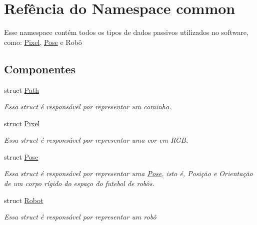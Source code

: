 \hypertarget{namespacecommon}{}\section{Refência do Namespace common}
\label{namespacecommon}


Esse namespace contém todos os tipos de dados passivos utilizados no software, como\+: \hyperlink{structcommon_1_1Pixel}{Pixel}, \hyperlink{structcommon_1_1Pose}{Pose} e Robô  


\subsection*{Componentes}
\begin{DoxyCompactItemize}
\item 
struct \hyperlink{structcommon_1_1Path}{Path}
\begin{DoxyCompactList}\small\item\em Essa struct é responsável por representar um caminho. \end{DoxyCompactList}\item 
struct \hyperlink{structcommon_1_1Pixel}{Pixel}
\begin{DoxyCompactList}\small\item\em Essa struct é responsável por representar uma cor em R\+GB. \end{DoxyCompactList}\item 
struct \hyperlink{structcommon_1_1Pose}{Pose}
\begin{DoxyCompactList}\small\item\em Essa struct é responsável por representar uma \hyperlink{structcommon_1_1Pose}{Pose}, isto é, Posição e Orientação de um corpo rígido do espaço do futebol de robôs. \end{DoxyCompactList}\item 
struct \hyperlink{structcommon_1_1Robot}{Robot}
\begin{DoxyCompactList}\small\item\em Essa struct é responsável por representar um robô \end{DoxyCompactList}\end{DoxyCompactItemize}
